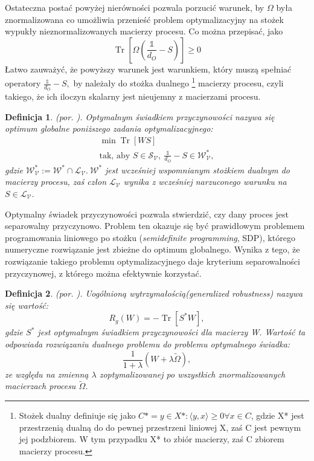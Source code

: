 \documentclass[10pt]{article} %
\newtheorem{definicja}{Definicja}
\DeclareMathOperator{\Trs}{Tr}
\newcommand{\I}{\mathbb{1}}
\begin{document}
Ostateczna postać powyżej nierówności pozwala porzucić warunek, by $\Omega$ była znormalizowana co umożliwia przenieść problem optymalizacyjny na stożek wypukły nieznormalizowanych macierzy procesu.
Co można przepisać, jako 
\begin{equation}
\Trs \left[ \Omega(\frac{\I}{d_O} -S) \right] \geq 0
\end{equation}
Łatwo zauważyć, że powyższy warunek jest warunkiem, który muszą spełniać operatory $\frac{\I}{d_O} - S,$ by należały do stożka dualnego
\footnote{
Stożek dualny definiuje się jako $C* = {y \in X*: \langle y, x \rangle \geq 0 \forall x \in C}$, gdzie X* jest przestrzenią dualną do do pewnej przestrzeni liniowej X, zaś C jest pewnym jej podzbiorem. W tym przypadku X* to zbiór macierzy, zaś C zbiorem macierzy procesu.
}
 macierzy procesu, czyli takiego, że ich iloczyn skalarny jest nieujemny z macierzami procesu.
\begin{definicja}
(por. \cite{causal_witness}).
Optymalnym świadkiem przyczynowości nazywa się optimum globalne poniższego zadania optymalizacyjnego:
\begin{gather}
\min \Trs \left[ WS \right]\\
\text{tak, aby } S \in \mathcal{S_V},~ \frac{\I}{d_O} - S \in \mathcal{W^*_V},
\end{gather}
gdzie $\mathcal{W^*_V}:=\mathcal{W^*} \cap \mathcal{L_V}.~ \mathcal{W^*}$ jest wcześniej wspomnianym stożkiem dualnym do macierzy procesu,
zaś człon $\mathcal{L_V}$ wynika z wcześniej narzuconego warunku na $S \in \mathcal{L_V}$. 
\end{definicja}
Optymalny świadek przyczynowości pozwala stwierdzić, czy dany proces jest separowalny przyczynowo.
Problem ten okazuje się być prawidłowym problemem
programowania liniowego po stożku (\textit{semidefinite programming}, SDP), którego numeryczne rozwiązanie jest zbieżne do optimum globalnego.
Wynika z tego, że rozwiązanie takiego problemu optymalizacyjnego daje kryterium separowalności przyczynowej, z którego można efektywnie korzystać.
\begin{definicja}
(por. \cite{causal_witness}).
Uogólnioną wytrzymałością(\textit{generalized robustness}) nazywa się wartość:
\begin{equation}
R_g(W) = -\Trs\left[ S^*W\right],
\end{equation} gdzie $S^*$ jest optymalnym świadkiem przyczynowości dla macierzy W. Wartość ta odpowiada rozwiązaniu dualnego problemu do problemu optymalnego świadka:
\begin{equation}
\frac{1}{1 + \lambda}\left( W + \lambda\widetilde{\Omega}\right),
\end{equation} ze względu na zmienną $\lambda$
zoptymalizowanej po wszystkich znormalizowanych macierzach procesu $\widetilde{\Omega}$. 
\end{definicja} 
\end{document}

